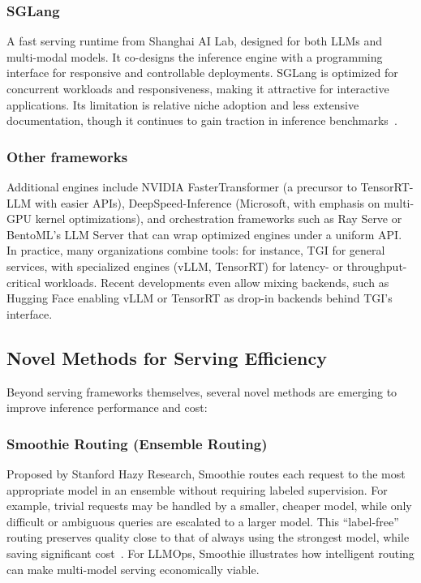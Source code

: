 \subsubsection{SGLang}
A fast serving runtime from Shanghai AI Lab, designed for both LLMs and multi-modal models. It co-designs the inference engine with a programming interface for responsive and controllable deployments. SGLang is optimized for concurrent workloads and responsiveness, making it attractive for interactive applications. Its limitation is relative niche adoption and less extensive documentation, though it continues to gain traction in inference benchmarks~\cite{sglang-github}.

\subsubsection{Other frameworks}
Additional engines include NVIDIA FasterTransformer (a precursor to TensorRT-LLM with easier APIs), DeepSpeed-Inference (Microsoft, with emphasis on multi-GPU kernel optimizations), and orchestration frameworks such as Ray Serve or BentoML’s LLM Server that can wrap optimized engines under a uniform API. In practice, many organizations combine tools: for instance, TGI for general services, with specialized engines (vLLM, TensorRT) for latency- or throughput-critical workloads. Recent developments even allow mixing backends, such as Hugging Face enabling vLLM or TensorRT as drop-in backends behind TGI’s interface.

\subsection{Novel Methods for Serving Efficiency}
\label{sec:serving-novel}

Beyond serving frameworks themselves, several novel methods are emerging to improve inference performance and cost:

\subsubsection{Smoothie Routing (Ensemble Routing)}
Proposed by Stanford Hazy Research, Smoothie routes each request to the most appropriate model in an ensemble without requiring labeled supervision. For example, trivial requests may be handled by a smaller, cheaper model, while only difficult or ambiguous queries are escalated to a larger model. This ``label-free'' routing preserves quality close to that of always using the strongest model, while saving significant cost~\cite{smoothie-routing}. For LLMOps, Smoothie illustrates how intelligent routing can make multi-model serving economically viable.


